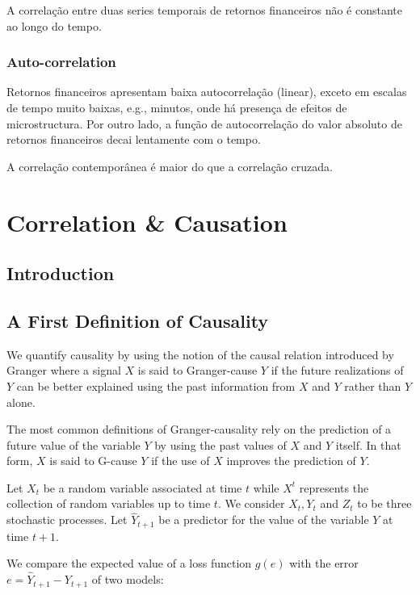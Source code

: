 \documentclass[]{book}
\theoremstyle{definition}
\theoremstyle{definition}
\theoremstyle{definition}
\theoremstyle{remark}
\begin{document}
A correlação entre duas series temporais de retornos financeiros não é
constante ao longo do tempo.

\subsection{Auto-correlation}\label{auto-correlation}

Retornos financeiros apresentam baixa autocorrelação (linear), exceto em
escalas de tempo muito baixas, e.g., minutos, onde há presença de
efeitos de microstructura. Por outro lado, a função de autocorrelação do
valor absoluto de retornos financeiros decai lentamente com o tempo.

A correlação contemporânea é maior do que a correlação cruzada.

\chapter{Correlation \& Causation}\label{correlation-causation}

\section{Introduction}\label{introduction-1}

\section{A First Definition of
Causality}\label{a-first-definition-of-causality}

We quantify causality by using the notion of the causal relation
introduced by Granger where a signal \(X\) is said to Granger-cause
\(Y\) if the future realizations of \(Y\) can be better explained using
the past information from \(X\) and \(Y\) rather than \(Y\) alone.

The most common definitions of Granger-causality rely on the prediction
of a future value of the variable \(Y\) by using the past values of
\(X\) and \(Y\) itself. In that form, \(X\) is said to G-cause \(Y\) if
the use of \(X\) improves the prediction of \(Y\).

Let \(X_t\) be a random variable associated at time \(t\) while \(X^t\)
represents the collection of random variables up to time \(t\). We
consider \({X_t}, {Y_t}\) and \({Z_t}\) to be three stochastic
processes. Let \(\hat Y_{t+1}\) be a predictor for the value of the
variable \(Y\) at time \(t+1\).

We compare the expected value of a loss function \(g(e)\) with the error
\(e=\hat{Y}_{t+1} - Y_{t+1}\) of two models:
\end{document}
